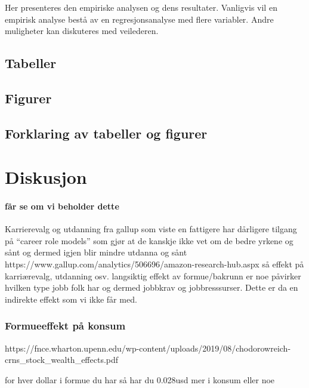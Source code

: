 \documentclass[
  12pt,
  a4paper,
  DIV=11,
  numbers=noendperiod]{scrartcl}
\let\oldparagraph\paragraph
\renewcommand{\paragraph}[1]{\oldparagraph{#1}\mbox{}}
\begin{document}
Her presenteres den empiriske analysen og dens resultater. Vanligvis vil
en empirisk analyse bestå av en regresjonsanalyse med flere variabler.
Andre muligheter kan diskuteres med veilederen.

\subsection{Tabeller}\label{tabeller}

\subsection{Figurer}\label{figurer}

\subsection{Forklaring av tabeller og
figurer}\label{forklaring-av-tabeller-og-figurer}

\newpage

\section{Diskusjon}\label{diskusjon}

\paragraph{får se om vi beholder
dette}\label{fuxe5r-se-om-vi-beholder-dette}

Karrierevalg og utdanning fra gallup som viste en fattigere har
dårligere tilgang på ``career role models'' som gjør at de kanskje ikke
vet om de bedre yrkene og sånt og dermed igjen blir mindre utdanna og
sånt https://www.gallup.com/analytics/506696/amazon-research-hub.aspx så
effekt på karriærevalg, utdanning osv. langsiktig effekt av
formue/bakrunn er noe påvirker hvilken type jobb folk har og dermed
jobbkrav og jobbresssurser. Dette er da en indirekte effekt som vi ikke
får med.

\subsubsection{Formueeffekt på konsum}\label{formueeffekt-puxe5-konsum}

https://fnce.wharton.upenn.edu/wp-content/uploads/2019/08/chodorowreich-crns\_stock\_wealth\_effects.pdf

for hver dollar i formue du har så har du 0.028usd mer i konsum eller
noe
\end{document}
